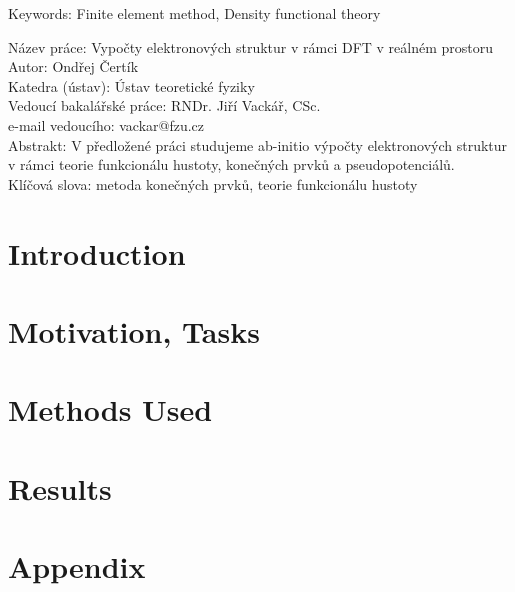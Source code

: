 \documentclass[12pt,notitlepage]{report}
\begin{document}
\noindent Keywords: Finite element method, Density functional theory

\vspace{10mm}

\noindent
Název práce: Vypočty elektronových struktur v rámci DFT v reálném prostoru\\
Autor: Ondřej Čertík\\
Katedra (ústav): Ústav teoretické fyziky\\
Vedoucí bakalářské práce: RNDr. Jiří Vackář, CSc.\\
e-mail vedoucího: vackar@fzu.cz\\

\noindent Abstrakt:  V předložené práci studujeme ab-initio výpočty
elektronových struktur v rámci teorie funkcionálu hustoty, konečných prvků a
pseudopotenciálů. \\

\noindent Klíčová slova: metoda konečných prvků, teorie funkcionálu hustoty

\tableofcontents %

\newpage

\chapter{Introduction}


\chapter{Motivation, Tasks}



\chapter{Methods Used}




\chapter{Results}



\chapter{Appendix}







\end{document}
